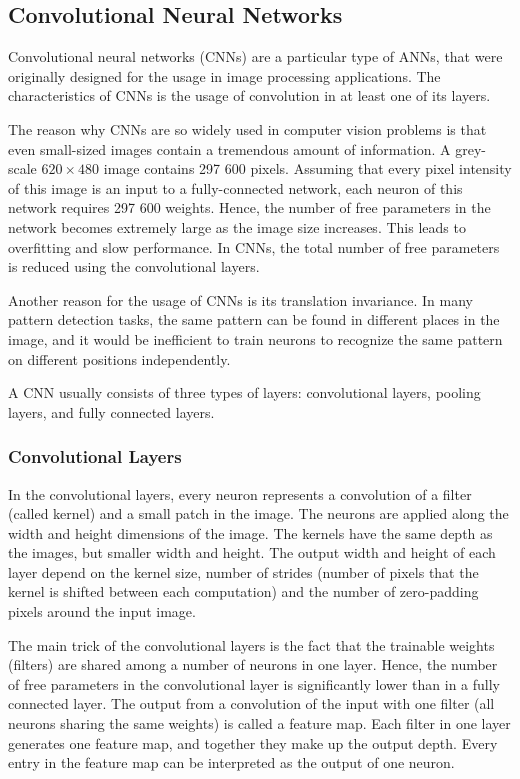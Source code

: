 \subsection{Convolutional Neural Networks}\label{tb:cnn}
Convolutional neural networks (CNNs) are a particular type of ANNs, that were originally designed for the usage in image processing applications. The characteristics of CNNs is the usage of convolution in at least one of its layers. 

The reason why CNNs are so widely used in computer vision problems is that even small-sized images contain a tremendous amount of information. A grey-scale $620\times480$ image contains 297 600 pixels. Assuming that every pixel intensity of this image is an input to a fully-connected network, each neuron of this network requires 297 600 weights. Hence, the number of free parameters in the network becomes extremely large as the image size increases. This leads to overfitting and slow performance. In CNNs, the total number of free parameters is reduced using the convolutional layers.

Another reason for the usage of CNNs is its translation invariance. In many pattern detection tasks, the same pattern can be found in different places in the image, and it would be inefficient to train neurons to recognize the same pattern on different positions independently.

A CNN usually consists of three types of layers: convolutional layers, pooling layers, and fully connected layers.

\subsubsection{Convolutional Layers}

In the convolutional layers, every neuron represents a convolution of a filter (called kernel) and a small patch in the image. The neurons are applied along the width and height dimensions of the image. The kernels have the same depth as the images, but smaller width and height. The output width and height of each layer depend on the kernel size, number of strides (number of pixels that the kernel is shifted between each computation) and the number of zero-padding pixels around the input image. 

The main trick of the convolutional layers is the fact that the trainable weights (filters) are shared among a number of neurons in one layer. Hence, the number of free parameters in the convolutional layer is significantly lower than in a fully connected layer. The output from a convolution of the input with one filter (all neurons sharing the same weights) is called a feature map. Each filter in one layer generates one feature map, and together they make up the output depth. Every entry in the feature map can be interpreted as the output of one neuron. 

